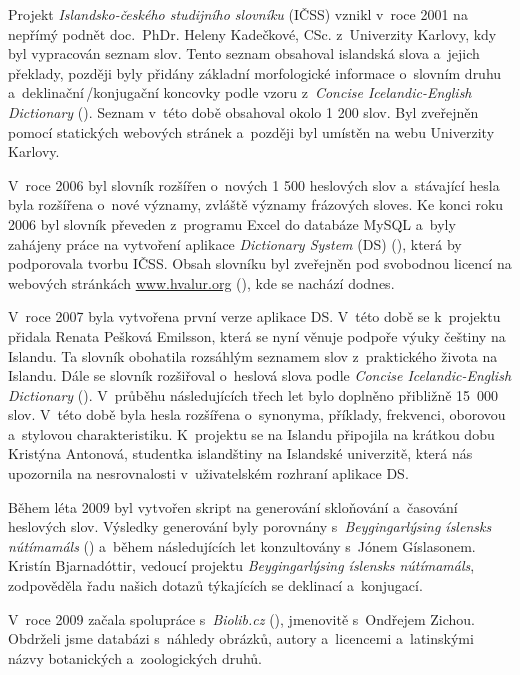 Projekt \textit{Islandsko-českého studijního slovníku} (IČSS) vznikl v~roce 2001 na nepřímý podnět doc. PhDr. Heleny Kadečkové, CSc. z~Univerzity Karlovy,
kdy byl vypracován seznam slov. 
Tento seznam obsahoval islandská slova a~jejich překlady, později byly přidány základní morfologické informace o~slovním druhu a~deklinační\,/\addthin konjugační koncovky podle vzoru z~\textit{Concise Icelandic-English Dictionary} (\cite {ic_en}). 
Seznam v~této době obsahoval okolo 1 200 slov. Byl zveřejněn pomocí statických webových stránek a~později byl umístěn na webu Univerzity Karlovy. 

V~roce 2006 byl slovník rozšířen o~nových 1 500 heslových slov a~stávající hesla byla rozšířena o~nové významy, zvláště významy frázových sloves. 
Ke konci roku 2006  byl slovník převeden z programu Excel do databáze MySQL a~byly zahájeny práce na vytvoření aplikace \textit{Dictionary System} (DS) (\cite {int19}), která by podporovala tvorbu IČSS. 
Obsah slovníku byl zveřejněn pod svobodnou licencí na webových stránkách \url{www.hvalur.org} (\cite {int14}), kde se nachází dodnes. 

V~roce 2007 byla vytvořena první verze aplikace DS. V~této době se k~projektu přidala Renata Pešková Emilsson, která se nyní věnuje podpoře výuky češtiny na Islandu. 
Ta slovník obohatila rozsáhlým seznamem slov z~praktického života na Islandu. Dále se slovník rozšiřoval o~heslová slova podle \textit{Concise Icelandic-English Dictionary} (\cite {ic_en}). 
V průběhu následujících třech let bylo doplněno přibližně 15~000 slov. V této době byla hesla rozšířena o~synonyma, příklady, frekvenci, oborovou a~stylovou charakteristiku. K projektu se na Islandu připojila na krátkou dobu Kristýna Antonová, studentka islandštiny na Islandské univerzitě, která 
nás upozornila na nesrovnalosti v~uživatelském rozhraní aplikace DS.

Během léta 2009 byl vytvořen skript na generování skloňování a~časování heslových slov. Výsledky generování byly porovnány s~\textit{Beygingarlýsing íslensks nútímamáls} (\cite {DalvikVM}) a~během následujících let konzultovány
s~Jónem Gíslasonem. Kristín Bjarnadóttir, vedoucí projektu \textit{Beygingarlýsing íslensks nútímamáls}, zodpověděla řadu našich dotazů týkajících se deklinací a~konjugací.

V~roce 2009 začala spolupráce s~\textit{Biolib.cz} (\cite {int5}), jmenovitě s~Ondřejem Zichou. Obdrželi jsme  databázi s~náhledy obrázků, autory a~licencemi a~latinskými názvy botanických a~zoologických druhů.

